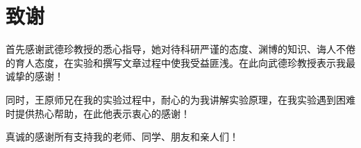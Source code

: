 \chapter*{致谢}
首先感谢武德珍教授的悉心指导，她对待科研严谨的态度、渊博的知识、诲人不倦的育人态度，在实验和撰写文章过程中使我受益匪浅。在此向武德珍教授表示我最诚挚的感谢！\par
同时，王原师兄在我的实验过程中，耐心的为我讲解实验原理，在我实验遇到困难时提供热心帮助，在此他表示衷心的感谢！\par
真诚的感谢所有支持我的老师、同学、朋友和亲人们！
